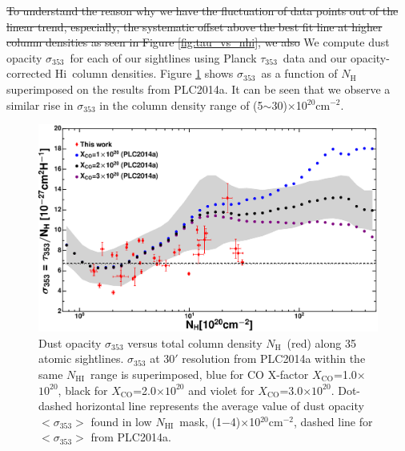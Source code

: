 \documentclass[preprint]{emulateapj}
\def\hi{H{\sc i}}
\def\NHI{$N_\mathrm{HI}$}
\def\NH{$N_\mathrm{H}$}
\def\s{s$^{-1}$}
\def\s353{$\sigma_{353}$}
\def\t353{$\tau_{353}$}
\def\xco{$X_\mathrm{CO}$}
\begin{document}
\sout{To understand the reason why we have the fluctuation of data points out of the linear trend, especially, the systematic offset above the best fit line at higher column densities %
as seen in Figure \ref{fig:tau_vs_nhi}, we also} 
We compute dust opacity \s353\ for each of our sightlines using Planck \t353\ data and our opacity-corrected \hi\ column densities. %
Figure \ref{fig:s353_vs_nh} shows \s353\ as a function of \NH\, superimposed on the results from PLC2014a. It can be seen that we observe a similar rise in \s353 in the column density range of (5$\sim$30)$\times$10$^{20}$cm$^{-2}$.

\begin{figure}
\includegraphics[width=1.0\linewidth]{fig/sig353_vs_nh.eps}
\caption{Dust opacity \s353 versus total column density \NH\ (red) along 35 atomic sightlines. \s353 at 30$'$ resolution from PLC2014a within the same \NHI\ range is superimposed, blue for CO X-factor \xco=1.0$\times$$10^{20}$, black for \xco=2.0$\times$$10^{20}$ and violet for \xco=3.0$\times$$10^{20}$. Dot-dashed horizontal line represents the average value of dust opacity $<$\s353$>$ found in low \NHI\ mask, (1$-$4)$\times$10$^{20}$cm$^{-2}$, dashed line for $<$\s353$>$ from PLC2014a.}
\label{fig:s353_vs_nh}
\end{figure}
\end{document}
